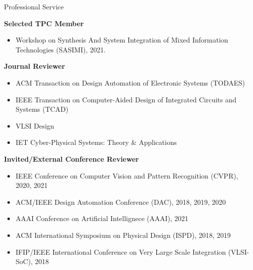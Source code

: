 
\begin{rSection}{Professional Service}

\textbf{Selected TPC Member}
\begin{itemize}
    \item Workshop on Synthesis And System Integration of Mixed Information Technologies (SASIMI), 2021.
\end{itemize}


\textbf{Journal Reviewer}
\begin{itemize}
    \item ACM Transaction on Design Automation of Electronic Systems (TODAES)
    \item IEEE Transaction on Computer-Aided Design of Integrated Circuits and Systems (TCAD)
    \item VLSI Design
    \item IET Cyber-Physical Systems: Theory \& Applications
\end{itemize}

\textbf{Invited/External Conference Reviewer}
\begin{itemize}
    \item IEEE Conference on Computer Vision and Pattern Recognition (CVPR), 2020, 2021
    \item ACM/IEEE Design Automation Conference (DAC), 2018, 2019, 2020
    \item AAAI Conference on Artificial Intellignece (AAAI), 2021
    \item ACM International Symposium on Physical Design (ISPD), 2018, 2019
    \item IFIP/IEEE International Conference on Very Large Scale Integration (VLSI-SoC), 2018
\end{itemize}
\end{rSection}


